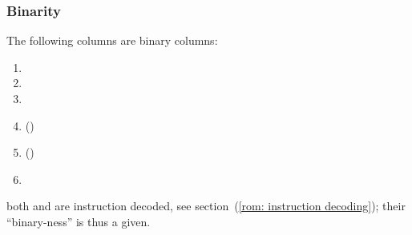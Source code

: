 \subsubsection{Binarity}
The following columns are binary columns:
\begin{multicols}{2}
\begin{enumerate}
    \item \CSR{}
    \item \IPD{}
    \item \PFB{}
    \item \IP{} \quad (\trash)
    \item \ISVALIDJUMPDESTINATION{} \quad (\trash)
    \item[\vspace{\fill}]
\end{enumerate}
\end{multicols}
\saNote{} both \IP{} and \ISVALIDJUMPDESTINATION{} are instruction decoded, see section~(\ref{rom: instruction decoding}); their ``binary-ness'' is thus a given.
